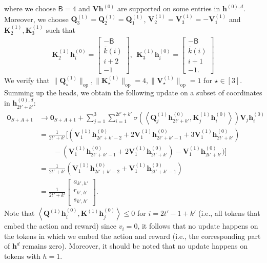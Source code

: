 \documentclass[10pt]{article}
\renewcommand{\bar}{\overline}
\newcommand{\lops}[1]{\|{#1}\|_{\mathrm{op}}}
\newcommand{\<}{\left\langle}
\renewcommand{\>}{\right\rangle}
\renewcommand{\bQ}{\mathbf{Q}}
\newcommand{\bzero}{{\mathbf 0}}
\newcommand{\partd}{{d}}
\newcommand{\state}{{s}}
\newcommand{\action}{{a}}
\newcommand{\reward}{{r}}
\newcommand{\tfthres}{{\mathsf{B}}}
\newcommand{\Numst}{{S}}
\newcommand{\Numact}{{A}}
\newcommand{\oddeven}{{v}}
\def\bK{{\mathbf K}}
\def\bQ{{\mathbf Q}}
\def\bV{{\mathbf V}}
\def\bh{{\mathbf h}}
\begin{document}
where we choose $\tfthres=4$ and $\bV\bh^{(0)}$ are supported on some entries in $\bh^{(0),\partd}$. Moreover, we choose $\bQ^{(1)}_{3}=\bQ^{(1)}_{2}=\bQ^{(1)}_1$, $\bV^{(1)}_2=\bV^{(1)}_3=-\bV^{(1)}_1$ and $\bK^{(1)}_2,\bK^{(1)}_3$ such that
\begin{align*}
    \bK^{(1)}_{2}\bh^{(0)}_{i}=\begin{bmatrix}
        -\tfthres\\\bar{k}(i)\\ i+2\\-1
\end{bmatrix},~~\bK^{(1)}_{3}\bh^{(0)}_{i}=\begin{bmatrix}
        -\tfthres\\\bar{k}(i)\\ i+1\\-1.
\end{bmatrix}
\end{align*}
We verify that $\lops{\bQ^{(1)}_{\star}},\lops{\bK^{(1)}_{\star}}= 4,\lops{\bV^{(1)}_{\star}}=1$ for $\star\in[3]$.
Summing up the  heads, we obtain the following update on a subset of coordinates in $\bh^{(0),\partd}_{2t'+k'}$:
\begin{align*}
\bzero_{\Numst+\Numact+1}
    &\rightarrow
\bzero_{\Numst+\Numact+1}+\sum_{j=1}^3\sum_{i=1}^{2t'+k'}\sigma(\<\bQ^{(1)}_{j}\bh^{(0)}_{2t'+k'},\bK^{(1)}_{j}\bh^{(0)}_{i}\>)\bV_j\bh^{(0)}_i\\
    &=\frac{1}{2t'+k'} [(\bV^{(1)}_1\bh^{(0)}_{2t'+k'-2}+2\bV^{(1)}_1\bh^{(0)}_{2t'+k'-1}+3\bV^{(1)}_1\bh^{(0)}_{2t'+k'})\\
    &\qquad-(\bV^{(1)}_1\bh^{(0)}_{2t'+k'-1}+2\bV^{(1)}_1\bh^{(0)}_{2t'+k'})-\bV^{(1)}_1\bh^{(0)}_{2t'+k'})]\\
    &=\frac{1}{2t'+k'}(\bV^{(1)}_1\bh^{(0)}_{2t'+k'-2}+\bV^{(1)}_1\bh^{(0)}_{2t'+k'-1})\\
    &=\frac{1}{2t'+k'}\begin{bmatrix}
        \action_{k',h'} \\\reward_{k',h'}\\\state_{k',h'}
    \end{bmatrix}.
\end{align*}
Note that $\<\bQ^{(1)}\bh^{(0)}_i,\bK^{(1)}\bh^{(0)}_j\>\leq0$ for $i=2t'-1+k'$ (i.e., all tokens that embed the action and reward) since $\oddeven_i=0$, it follows that no update happens on the tokens in which we embed the action and reward (i.e., the corresponding part of $\bh^\partd$ remains zero). Moreover, it should be noted that no  update happens on tokens with $h=1$.
\end{document}
